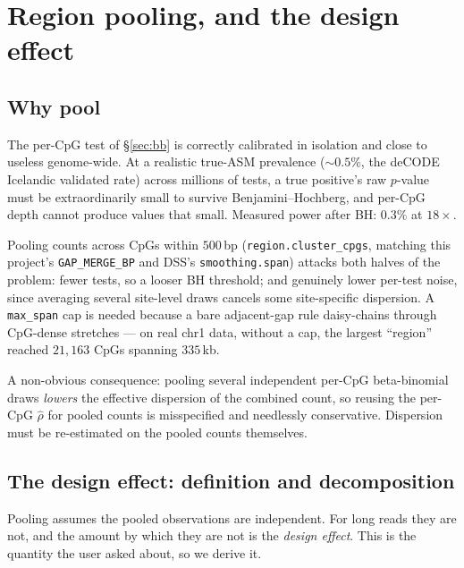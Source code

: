 \documentclass[11pt]{article}
\begin{document}
\section{Region pooling, and the design effect}
\label{sec:de}

\subsection{Why pool}

The per-CpG test of \S\ref{sec:bb} is correctly calibrated in isolation and
close to useless genome-wide. At a realistic true-ASM prevalence
($\sim0.5\%$, the deCODE Icelandic validated rate) across millions of tests, a
true positive's raw $p$-value must be extraordinarily small to survive
Benjamini--Hochberg, and per-CpG depth cannot produce values that small.
Measured power after BH: $0.3\%$ at $18\times$.

Pooling counts across CpGs within $500$\,bp (\texttt{region.cluster\_cpgs},
matching this project's \texttt{GAP\_MERGE\_BP} and DSS's
\texttt{smoothing.span}) attacks both halves of the problem: fewer tests, so a
looser BH threshold; and genuinely lower per-test noise, since averaging several
site-level draws cancels some site-specific dispersion. A \texttt{max\_span} cap
is needed because a bare adjacent-gap rule daisy-chains through CpG-dense
stretches --- on real chr1 data, without a cap, the largest ``region'' reached
$21{,}163$ CpGs spanning $335$\,kb.

A non-obvious consequence: pooling several independent per-CpG beta-binomial
draws \emph{lowers} the effective dispersion of the combined count, so reusing
the per-CpG $\hat\rho$ for pooled counts is misspecified and needlessly
conservative. Dispersion must be re-estimated on the pooled counts themselves.

\subsection{The design effect: definition and decomposition}

Pooling assumes the pooled observations are independent. For long reads they are
not, and the amount by which they are not is the \emph{design effect}. This is
the quantity the user asked about, so we derive it.
\end{document}
